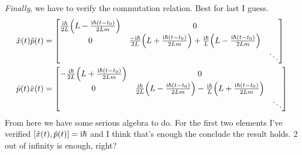 \documentclass[boxes,pages]{homework}
\makeatletter
\newcommand{\iu}{\mathrm{i}}
\numberwithin{@problem}{section}
\makeatother
\begin{document}
\begin{solution}
	\emph{Finally}, we have to verify the commutation relation. Best for last I guess.
	\begin{align*}
		\hat{x}(t)\hat{p}(t) & = \mqty[\frac{\iu\hbar}{2L}\qty(L - \frac{\iu\hbar(t - t_0)}{2Lm}) & 0 & \\ 0 & \frac{-\iu\hbar}{2L}\qty(L + \frac{\iu\hbar(t - t_0)}{2Lm}) + \frac{\iu\hbar}{L}\qty(L - \frac{\iu\hbar(t - t_0)}{2Lm}) & \\ & & \ddots] \\
		\hat{p}(t)\hat{x}(t) & = \mqty[-\frac{\iu\hbar}{2L}\qty(L + \frac{\iu\hbar(t - t_0)}{2Lm}) & 0 & \\ 0 & \frac{\iu\hbar}{2L}\qty(L - \frac{\iu\hbar(t - t_0)}{2Lm}) - \frac{\iu\hbar}{L}\qty(L + \frac{\iu\hbar(t - t_0)}{2Lm}) & \\ & & \ddots]
	\end{align*}
	From here we have some serious algebra to do. For the first two elements I've verified $\comm{\hat{x}(t)}{\hat{p}(t)} = \iu\hbar$ and I think that's enough the conclude the result holds. 2 out of infinity is enough, right?
\end{solution}
\end{document}
